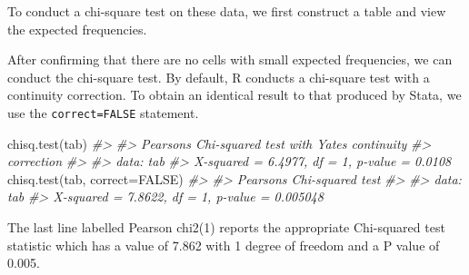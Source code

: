 \documentclass[
]{memoir}
\newenvironment{Shaded}{\begin{snugshade}}{\end{snugshade}}
\newcommand{\AttributeTok}[1]{\textcolor[rgb]{0.77,0.63,0.00}{#1}}
\newcommand{\CommentTok}[1]{\textcolor[rgb]{0.56,0.35,0.01}{\textit{#1}}}
\newcommand{\ConstantTok}[1]{\textcolor[rgb]{0.00,0.00,0.00}{#1}}
\newcommand{\FunctionTok}[1]{\textcolor[rgb]{0.00,0.00,0.00}{#1}}
\newcommand{\NormalTok}[1]{#1}
\newcommand{\OtherTok}[1]{\textcolor[rgb]{0.56,0.35,0.01}{#1}}
\newcommand{\SpecialCharTok}[1]{\textcolor[rgb]{0.00,0.00,0.00}{#1}}
\begin{document}
To conduct a chi-square test on these data, we first construct a table and view the expected frequencies.

\begin{Shaded}
\end{Shaded}

After confirming that there are no cells with small expected frequencies, we can conduct the chi-square test. By default, R conducts a chi-square test with a continuity correction. To obtain an identical result to that produced by Stata, we use the \texttt{correct=FALSE} statement.

\begin{Shaded}
\begin{Highlighting}[]
\FunctionTok{chisq.test}\NormalTok{(tab)}
\CommentTok{\#\textgreater{} }
\CommentTok{\#\textgreater{}  Pearson\textquotesingle{}s Chi{-}squared test with Yates\textquotesingle{} continuity}
\CommentTok{\#\textgreater{}  correction}
\CommentTok{\#\textgreater{} }
\CommentTok{\#\textgreater{} data:  tab}
\CommentTok{\#\textgreater{} X{-}squared = 6.4977, df = 1, p{-}value = 0.0108}
\FunctionTok{chisq.test}\NormalTok{(tab, }\AttributeTok{correct=}\ConstantTok{FALSE}\NormalTok{)}
\CommentTok{\#\textgreater{} }
\CommentTok{\#\textgreater{}  Pearson\textquotesingle{}s Chi{-}squared test}
\CommentTok{\#\textgreater{} }
\CommentTok{\#\textgreater{} data:  tab}
\CommentTok{\#\textgreater{} X{-}squared = 7.8622, df = 1, p{-}value = 0.005048}
\end{Highlighting}
\end{Shaded}

The last line labelled Pearson chi2(1) reports the appropriate Chi-squared test statistic which has a value of 7.862 with 1 degree of freedom and a P value of 0.005.
\end{document}
